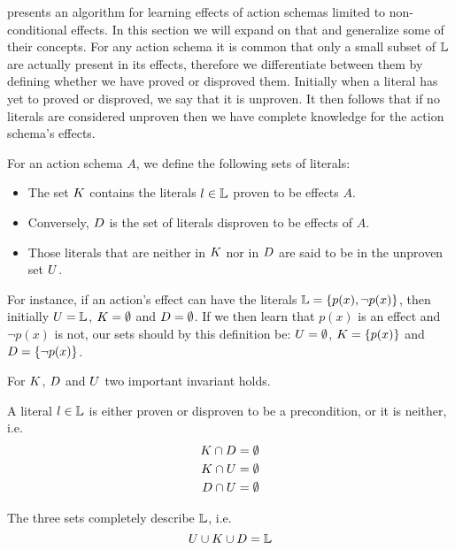 \documentclass[../Master.tex]{subfiles}
\begin{document}
\cite{Walsh2008} presents an algorithm for learning effects of action schemas limited to non-conditional effects. In this section we will expand on that and generalize some of their concepts.
For any action schema it is common that only a small subset of $\mathbb{L}$ are actually present in its effects, 
therefore we differentiate between them by defining whether we have proved or disproved them. 
Initially when a literal has yet to proved or disproved, we say that it is unproven. 
It then follows that if no literals are considered unproven then we have complete knowledge for the action schema's effects.


\begin{definition} 
	For an action schema $A$, we define the following sets of literals:
	\begin{itemize}
		\item The set $K$ contains the literals  $l \in \mathbb{L}$ proven to be effects $A$.
		\item Conversely, $D$ is the set of literals disproven to be effects of $A$.
		\item Those literals that are neither in $K$ nor in $D$ are said to be in the unproven set $U$.
	\end{itemize}
	For instance, if an action's effect can have the literals $\mathbb{L} = \{p(x), \neg p(x)\}$, 
	then initially $U = \mathbb{L}$, $K = \emptyset$ and $D = \emptyset$. 
	If we then learn that $p(x)$ is an effect and $\neg p(x)$ is not, 
	our sets should by this definition be: $U = \emptyset$, $K = \{p(x)\}$ and $D = \{\neg p(x)\}$. 
	
\end{definition}

For $K$, $D$ and $U$ two important invariant holds.

\begin{invariant}\label{inv:nca:mutual-ex}
	A literal $l \in \mathbb{L}$ is either proven or disproven to be a precondition, or it is neither, i.e.\
	\begin{equation*}
	\begin{split}
	K \cap D & = \emptyset  \\ 
	K \cap U &= \emptyset \\
	D \cap U &= \emptyset
	\end{split}
	\end{equation*}
\end{invariant}

\begin{invariant}[Completeness]
	The three sets completely describe $\mathbb{L}$, i.e.\ 
	\begin{equation*}
	U \cup K \cup D = \mathbb{L}
	\end{equation*}
\end{invariant}
\end{document}
